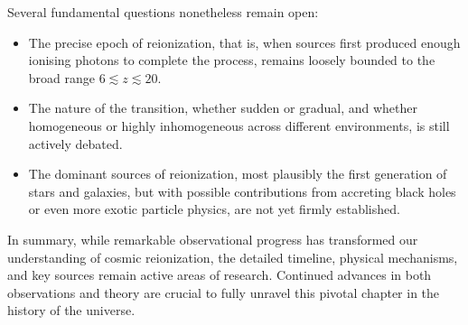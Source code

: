 \smallskip

Several fundamental questions nonetheless remain open:

\begin{itemize}
    \item The precise epoch of reionization, that is, when sources first produced enough ionising photons to complete the process, remains loosely bounded to the broad range $6 \lesssim z \lesssim 20$. 
    \item The nature of the transition, whether sudden or gradual, and whether homogeneous or highly inhomogeneous across different environments, is still actively debated. 
    \item The dominant sources of reionization, most plausibly the first generation of stars and galaxies, but with possible contributions from accreting black holes or even more exotic particle physics, are not yet firmly established.
\end{itemize}

In summary, while remarkable observational progress has transformed our understanding of cosmic reionization, the detailed timeline, physical mechanisms, and key sources remain active areas of research. Continued advances in both observations and theory are crucial to fully unravel this pivotal chapter in the history of the universe.